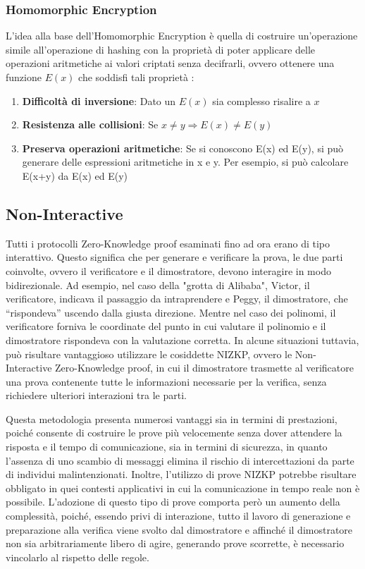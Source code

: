 \subsubsection{Homomorphic Encryption}

L'idea alla base dell'Homomorphic Encryption è quella di costruire un'operazione simile all'operazione di hashing con la
proprietà di poter applicare delle operazioni aritmetiche ai valori criptati senza decifrarli, ovvero ottenere una
funzione $E(x)$ che soddisfi tali proprietà :
\begin{enumerate}
    \item \textbf{Difficoltà di inversione}: Dato un  $E(x)$ sia complesso risalire a $x$
    \item \textbf{Resistenza alle collisioni}: Se $x \ne y \Rightarrow E(x) \ne E(y)$
    \item \textbf{Preserva operazioni aritmetiche}: Se si conoscono E(x) ed E(y), si può generare
    delle espressioni aritmetiche in x e y. Per esempio, si può calcolare E(x+y) da E(x) ed E(y)
\end{enumerate}
\clearpage

\subsection{Non-Interactive}
\label{sec:non-interactive}

Tutti i protocolli Zero-Knowledge proof esaminati fino ad ora erano di tipo interattivo. Questo significa che per
generare e verificare la prova, le due parti coinvolte, ovvero il verificatore e il dimostratore, devono interagire in
modo bidirezionale. Ad esempio, nel caso della "grotta di Alibaba", Victor, il verificatore, indicava il passaggio da
intraprendere e Peggy, il dimostratore, che “rispondeva” uscendo dalla giusta direzione. Mentre nel caso dei
polinomi, il verificatore forniva le coordinate del punto in cui valutare il polinomio e il dimostratore rispondeva con
la valutazione corretta. In alcune situazioni tuttavia, può risultare vantaggioso utilizzare le cosiddette NIZKP, ovvero
le Non-Interactive Zero-Knowledge proof, in cui il dimostratore trasmette al verificatore una prova contenente tutte le
informazioni necessarie per la verifica, senza richiedere ulteriori interazioni tra le parti. 

Questa metodologia presenta numerosi vantaggi sia in termini di prestazioni, poiché consente di costruire le prove più
velocemente senza dover attendere la risposta e il tempo di comunicazione, sia in termini di sicurezza, in quanto
l'assenza di uno scambio di messaggi elimina il rischio di intercettazioni da parte di individui malintenzionati.
Inoltre, l'utilizzo di prove NIZKP potrebbe risultare obbligato in quei contesti applicativi in cui la comunicazione in
tempo reale non è possibile. L'adozione di questo tipo di prove comporta però un aumento della complessità, poiché,
essendo privi di interazione, tutto il lavoro di generazione e preparazione alla verifica viene svolto dal dimostratore
e affinché il dimostratore non sia arbitrariamente libero di agire, generando prove scorrette, è necessario vincolarlo
al rispetto delle regole. 

